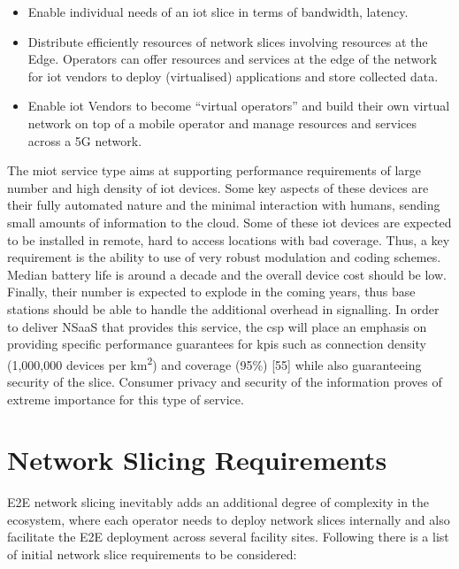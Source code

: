     \begin{itemize}
        \item Enable individual needs of an \acrshort{iot} slice in terms of bandwidth, latency.
        \item Distribute efficiently resources of network slices involving resources at the Edge. Operators can offer resources and services at the edge of the network for \acrshort{iot} vendors to deploy (virtualised) applications and store collected data.
        \item Enable \acrshort{iot} Vendors to become “virtual operators” and build their own virtual network on top of a mobile operator and manage resources and services across a 5G network.
    \end{itemize}
    The \acrshort{miot} service type aims at supporting performance requirements of large number and high density of \acrshort{iot} devices. Some key aspects of these devices are their fully automated nature and the minimal interaction with humans, sending small amounts of information to the cloud. Some of these \acrshort{iot} devices are expected to be installed in remote, hard to access locations with bad coverage. Thus, a key requirement is the ability to use of very robust modulation and coding schemes. Median battery life is around a decade and the overall device cost should be low. Finally, their number is expected to explode in the coming years, thus base stations should be able to handle the additional overhead in signalling. In order to deliver NSaaS that provides this service, the \acrshort{csp} will place an emphasis on providing specific performance guarantees for \acrshort{kpi}s such as connection density (1,000,000 devices per km\textsuperscript{2}) and coverage (95\%) [55] while also guaranteeing security of the slice. Consumer privacy and security of the information proves of extreme importance for this type of service. 

\section{Network Slicing Requirements}
E2E network slicing inevitably adds an additional degree of complexity in the ecosystem, where each operator needs to deploy network slices internally and also facilitate the E2E deployment across several facility sites. Following there is a list of initial network slice requirements to be considered:

